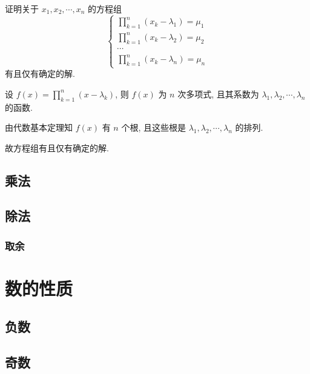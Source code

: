 \begin{question}
  证明关于 $x_1, x_2, \cdots, x_n$ 的方程组
  \[
    \left\{
    \begin{gathered}
      \prod_{k = 1}^{n} (x_k - \lambda_1) = \mu_1 \\
      \prod_{k = 1}^{n} (x_k - \lambda_2) = \mu_2 \\
      \cdots                                      \\
      \prod_{k = 1}^{n} (x_k - \lambda_n) = \mu_n
    \end{gathered}
    \right.
  \]
  有且仅有确定的解.
\end{question}

\begin{solution}
  设 $f(x) = \prod_{k = 1}^{n} (x - \lambda_k)$, 则 $f(x)$ 为 $n$ 次多项式, 且其系数为 $\lambda_1, \lambda_2, \cdots, \lambda_n$ 的函数.

  由代数基本定理知 $f(x)$ 有 $n$ 个根, 且这些根是 $\lambda_1, \lambda_2, \cdots, \lambda_n$ 的排列.

  故方程组有且仅有确定的解.
\end{solution}

\subsection{乘法} \label{subsec:multiplication}

\subsection{除法} \label{subsec:division}

\subsubsection{取余} \label{subsubsec:modulus}

\section{数的性质} \label{sec:number-properties}

\subsection{负数} \label{subsec:negative-number}

\subsection{奇数} \label{subsec:odd-number}

